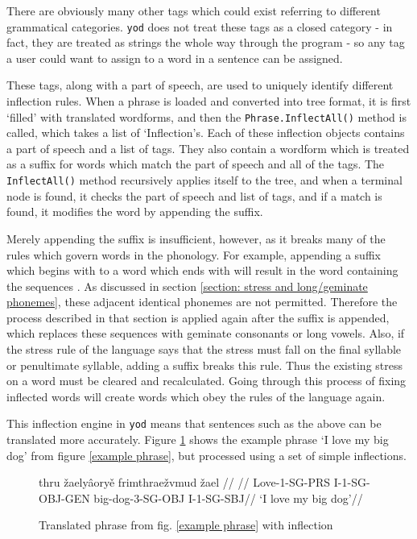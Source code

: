 \documentclass{report}
\begin{document}
	There are obviously many other tags which could exist referring to different grammatical categories. \texttt{yod} does not treat these tags as a closed category - in fact, they are treated as strings the whole way through the program - so any tag a user could want to assign to a word in a sentence can be assigned.
	
	These tags, along with a part of speech, are used to uniquely identify different inflection rules. When a phrase is loaded and converted into tree format, it is first `filled' with translated wordforms, and then the \texttt{Phrase.InflectAll()} method is called, which takes a list of `Inflection's. Each of these inflection objects contains a part of speech and a list of tags. They also contain a wordform which is treated as a suffix for words which match the part of speech and all of the tags. The \texttt{InflectAll()} method recursively applies itself to the tree, and when a terminal node is found, it checks the part of speech and list of tags, and if a match is found, it modifies the word by appending the suffix.
	
	Merely appending the suffix is insufficient, however, as it breaks many of the rules which govern words in the phonology. For example, appending a suffix which begins with  to a word which ends with  will result in the word containing the sequences . As discussed in section \ref{section: stress and long/geminate phonemes}, these adjacent identical phonemes are not permitted. Therefore the process described in that section is applied again after the suffix is appended, which replaces these sequences with geminate consonants or long vowels. Also, if the stress rule of the language says that the stress must fall on the final syllable or penultimate syllable, adding a suffix breaks this rule. Thus the existing stress on a word must be cleared and recalculated. Going through this process of fixing inflected words will create words which obey the rules of the language again.
	
	This inflection engine in \texttt{yod} means that sentences such as the above can be translated more accurately. Figure \ref{inflected phrase} shows the example phrase `I love my big dog' from figure \ref{example phrase}, but processed using a set of simple inflections.
	
	\begin{figure}
		\caption{Translated phrase from fig. \ref{example phrase} with inflection}
		\label{inflected phrase}
		\begin{tcolorbox}
			\begin{small}
				\ex 
				\begingl
				\gla thru\dh{} \v{z}ael\dj{}y\^{a}ory\v{e} frimthrae\v{z}vmud \v{z}ael //
				\glb {}   //
				\glc Love-\textsc{1-SG-PRS} I-\textsc{1-SG-OBJ-GEN} big-dog-\textsc{3-SG-OBJ} I-\textsc{1-SG-SBJ}//
				\glft `I love my big dog'//
				\endgl
				\xe
			\end{small}
		\end{tcolorbox}
	\end{figure}
\end{document}
